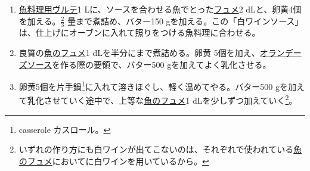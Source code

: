 \begin{recette}
\begin{enumerate}
\def\labelenumi{\arabic{enumi}.}
\item
  \protect\hyperlink{veloute-de-poisson}{魚料理用ヴルテ}1
  Lに、ソースを合わせる魚でとった\protect\hyperlink{fumet-de-poisson}{フュメ}2
  dLと、卵黄4個を加える。\(\frac{2}{3}\) 量まで煮詰め、バター150
  gを加える。この「白ワインソース」は、仕上げにオーブンに入れて照りをつける魚料理に合わせる。
\item
  良質の\protect\hyperlink{fumet-de-poisson}{魚のフュメ}1
  dLを半分にまで煮詰める。卵黄
  5個を加え、\protect\hyperlink{sauce-hollandaise}{オランデーズソース}を作る際の要領で、バター500
  gを加えてよく乳化させる。
\item
  卵黄5個を片手鍋\footnote{casserole カスロール。}に入れて溶きほぐし、軽く温めてやる。バター500
  gを加えて乳化させていく途中で、上等な\protect\hyperlink{fumet-de-poisson}{魚のフュメ}1
  dLを少しずつ加えていく\footnote{いずれの作り方にも白ワインが出てこないのは、それぞれで使われている\protect\hyperlink{fumet-de-poisson}{魚のフュメ}においてに白ワインを用いているから。}。
\end{enumerate}
\end{recette}